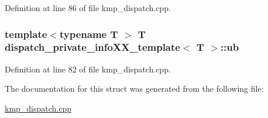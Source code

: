 Definition at line 86 of file kmp\-\_\-dispatch.\-cpp.

\hypertarget{structdispatch__private__infoXX__template_a243c57f29d939bdbec44f77b55bc18e5}{
\subsubsection[{ub}]{\setlength{\rightskip}{0pt plus 5cm}template$<$typename T $>$ T {\bf dispatch\-\_\-private\-\_\-info\-X\-X\-\_\-template}$<$ T $>$\-::ub}}\label{structdispatch__private__infoXX__template_a243c57f29d939bdbec44f77b55bc18e5}


Definition at line 82 of file kmp\-\_\-dispatch.\-cpp.



The documentation for this struct was generated from the following file\-:\begin{DoxyCompactItemize}
\item 
\hyperlink{kmp__dispatch_8cpp}{kmp\-\_\-dispatch.\-cpp}\end{DoxyCompactItemize}
